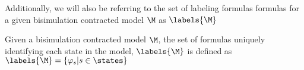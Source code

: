 Additionally, we will also be referring to the set of labeling formulas formulas for a given bisimulation contracted model $\M$ as $\labels{\M}$

\begin{definition}
	\label{def:labelSet}
	Given a bisimulation contracted model $\M$, the set of formulas uniquely identifying each state in the model, $\labels{\M}$ is defined as $\labels{\M} = \{\varphi_s | s \in \states\}$
\end{definition}



